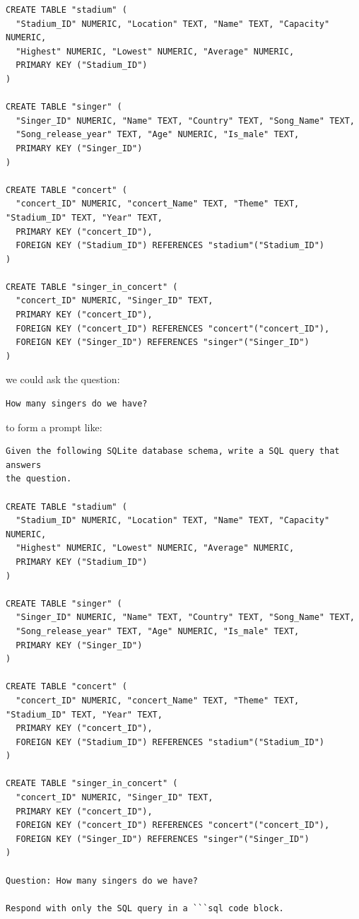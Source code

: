 \documentclass[11pt]{article}
\begin{document}
\begin{verbatim}
CREATE TABLE "stadium" (
  "Stadium_ID" NUMERIC, "Location" TEXT, "Name" TEXT, "Capacity" NUMERIC,
  "Highest" NUMERIC, "Lowest" NUMERIC, "Average" NUMERIC,
  PRIMARY KEY ("Stadium_ID")
)

CREATE TABLE "singer" (
  "Singer_ID" NUMERIC, "Name" TEXT, "Country" TEXT, "Song_Name" TEXT,
  "Song_release_year" TEXT, "Age" NUMERIC, "Is_male" TEXT,
  PRIMARY KEY ("Singer_ID")
)

CREATE TABLE "concert" (
  "concert_ID" NUMERIC, "concert_Name" TEXT, "Theme" TEXT, "Stadium_ID" TEXT, "Year" TEXT,
  PRIMARY KEY ("concert_ID"),
  FOREIGN KEY ("Stadium_ID") REFERENCES "stadium"("Stadium_ID")
)

CREATE TABLE "singer_in_concert" (
  "concert_ID" NUMERIC, "Singer_ID" TEXT,
  PRIMARY KEY ("concert_ID"),
  FOREIGN KEY ("concert_ID") REFERENCES "concert"("concert_ID"),
  FOREIGN KEY ("Singer_ID") REFERENCES "singer"("Singer_ID")
)
\end{verbatim}

we could ask the question:
\begin{verbatim}
How many singers do we have?
\end{verbatim}

to form a prompt like:

\begin{verbatim}
Given the following SQLite database schema, write a SQL query that answers
the question.

CREATE TABLE "stadium" (
  "Stadium_ID" NUMERIC, "Location" TEXT, "Name" TEXT, "Capacity" NUMERIC,
  "Highest" NUMERIC, "Lowest" NUMERIC, "Average" NUMERIC,
  PRIMARY KEY ("Stadium_ID")
)

CREATE TABLE "singer" (
  "Singer_ID" NUMERIC, "Name" TEXT, "Country" TEXT, "Song_Name" TEXT,
  "Song_release_year" TEXT, "Age" NUMERIC, "Is_male" TEXT,
  PRIMARY KEY ("Singer_ID")
)

CREATE TABLE "concert" (
  "concert_ID" NUMERIC, "concert_Name" TEXT, "Theme" TEXT, "Stadium_ID" TEXT, "Year" TEXT,
  PRIMARY KEY ("concert_ID"),
  FOREIGN KEY ("Stadium_ID") REFERENCES "stadium"("Stadium_ID")
)

CREATE TABLE "singer_in_concert" (
  "concert_ID" NUMERIC, "Singer_ID" TEXT,
  PRIMARY KEY ("concert_ID"),
  FOREIGN KEY ("concert_ID") REFERENCES "concert"("concert_ID"),
  FOREIGN KEY ("Singer_ID") REFERENCES "singer"("Singer_ID")
)

Question: How many singers do we have?

Respond with only the SQL query in a ```sql code block.
\end{verbatim}
\end{document}
